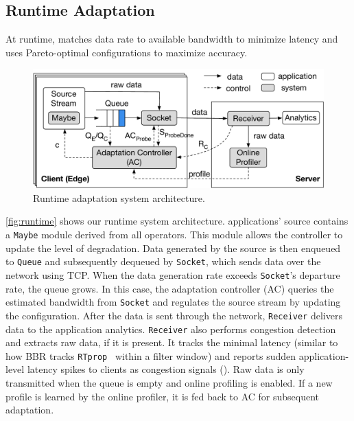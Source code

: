 \subsection{Runtime Adaptation}
\label{sec:runtime}

At runtime, \sysname{} matches data rate to available bandwidth to minimize
latency and uses Pareto-optimal configurations to maximize accuracy.

\begin{figure}
  \centering
  \includegraphics[width=\linewidth]{figures/runtime-adaptation.pdf}
  \caption{Runtime adaptation system architecture.}
  \label{fig:runtime}
  \vspace{-1em}
\end{figure}

\autoref{fig:runtime} shows our runtime system architecture. \sysname{}
applications' source contains a \texttt{Maybe} module derived from all \maybe{}
operators. This module allows the controller to update the level of
degradation. Data generated by the source is then enqueued to \texttt{Queue} and
subsequently dequeued by \texttt{Socket}, which sends data over the network
using TCP. When the data generation rate exceeds \texttt{Socket}'s departure
rate, the queue grows. In this case, the adaptation controller (AC) queries the
estimated bandwidth from \texttt{Socket} and regulates the source stream by
updating the configuration. After the data is sent through the network,
\texttt{Receiver} delivers data to the application analytics. \texttt{Receiver}
also performs congestion detection and extracts raw data, if it is present.  It
tracks the minimal latency (similar to how BBR tracks
\texttt{RTprop}~\cite{cardwell2017bbr} within a filter window) and reports
sudden application-level latency spikes to clients as congestion signals
(\rc{}). Raw data is only transmitted when the queue is empty and online
profiling is enabled. If a new profile is learned by the online profiler, it is
fed back to AC for subsequent adaptation.

